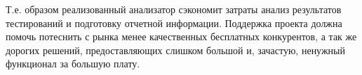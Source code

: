 	Т.е. образом реализованный анализатор сэкономит затраты анализ результатов тестирований и подготовку отчетной информации. Поддержка проекта должна помочь потеснить с рынка менее качественных бесплатных конкурентов, а так же дорогих решений, предоставляющих слишком большой и, зачастую, ненужный функционал за большую плату. 